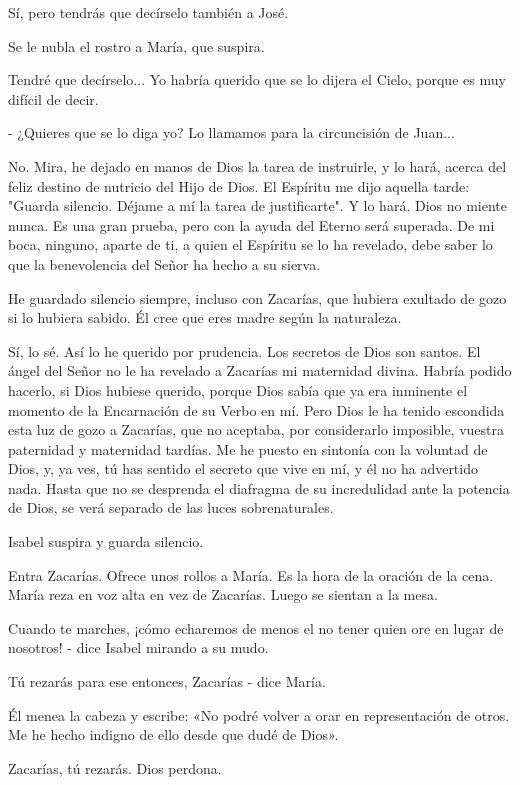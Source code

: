 \documentclass[12pt, twoside, openright]{book} %
\begin{document}
Sí, pero tendrás que decírselo también a José. 

Se le nubla el rostro a María, que suspira. 

Tendré que decírselo... Yo habría querido que se lo dijera el Cielo, porque es muy difícil de decir. 

- ¿Quieres que se lo diga yo? Lo llamamos para la circuncisión de Juan... 

No. Mira, he dejado en manos de Dios la tarea de instruirle, y lo hará, acerca del feliz destino de nutricio del Hijo de Dios. El Espíritu me dijo aquella tarde: "Guarda silencio. Déjame a mí la tarea de justificarte". Y lo hará. Dios no miente nunca. Es una gran prueba, pero con la ayuda del Eterno será superada. De mi boca, ninguno, aparte de ti, a quien el Espíritu se lo ha revelado, debe saber lo que la benevolencia del Señor ha hecho a su sierva. 

He guardado silencio siempre, incluso con Zacarías, que hubiera exultado de gozo si lo hubiera sabido. Él cree que eres madre según la naturaleza. 

Sí, lo sé. Así lo he querido por prudencia. Los secretos de Dios son santos. El ángel del Señor no le ha revelado a Zacarías mi maternidad divina. Habría podido hacerlo, si Dios hubiese querido, porque Dios sabía que ya era inminente el momento de la Encarnación de su Verbo en mí. Pero Dios le ha tenido escondida esta luz de gozo a Zacarías, que no aceptaba, por considerarlo imposible, vuestra paternidad y maternidad tardías. Me he puesto en sintonía con la voluntad de Dios, y, ya ves, tú has sentido el secreto que vive en mí, y él no ha advertido nada. Hasta que no se desprenda el diafragma de su incredulidad ante la potencia de Dios, se verá separado de las luces sobrenaturales. 

Isabel suspira y guarda silencio. 

Entra Zacarías. Ofrece unos rollos a María. Es la hora de la oración de la cena. María reza en voz alta en vez de Zacarías. Luego se sientan a la mesa. 

Cuando te marches, ¡cómo echaremos de menos el no tener quien ore en lugar de nosotros! - dice Isabel mirando a su mudo. 

Tú rezarás para ese entonces, Zacarías - dice María. 

Él menea la cabeza y escribe: «No podré volver a orar en representación de otros. Me he hecho indigno de ello desde que dudé de Dios». 

Zacarías, tú rezarás. Dios perdona. 
\end{document}
